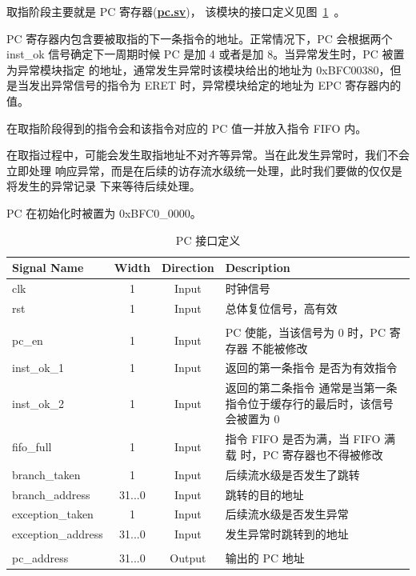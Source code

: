 \documentclass[blue,normal,cn,hide]{elegantbook}
\begin{document}
取指阶段主要就是 PC 寄存器(\href{https://github.com/name1e5s/Sirius/blob/master/pc.sv}{\textbf{pc.sv}})，
该模块的接口定义见图~\ref{tab:PCInterface}~。

PC 寄存器内包含要被取指的下一条指令的地址。正常情况下，PC 会根据两个 inst\_ok
信号确定下一周期时候 PC 是加 4 或者是加 8。当异常发生时，PC 被置为异常模块指定
的地址，通常发生异常时该模块给出的地址为 0xBFC00380，但是当发出异常信号的指令为
ERET 时，异常模块给定的地址为 EPC 寄存器内的值。

在取指阶段得到的指令会和该指令对应的 PC 值一并放入指令 FIFO 内。

在取指过程中，可能会发生取指地址不对齐等异常。当在此发生异常时，我们不会立即处理
响应异常，而是在后续的访存流水级统一处理，此时我们要做的仅仅是将发生的异常记录
下来等待后续处理。

PC 在初始化时被置为 0xBFC0\_0000。

\begin{table}
    \renewcommand\arraystretch{1.25}
    \centering
    \begin{tabular}{lccm{}}
        \toprule 
        \rowcolor{black!20} \textbf{Signal Name} & \textbf{Width} & \textbf{Direction} & \textbf{Description} \\
        \midrule
        clk & 1 & Input & 时钟信号 \\
        rst & 1 & Input & 总体复位信号，高有效 \\
        \\
        pc\_en & 1 & Input & PC 使能，当该信号为 0 时，PC 寄存器
        不能被修改 \\
        inst\_ok\_1 & 1 & Input & 返回的第一条指令
        是否为有效指令 \\
        inst\_ok\_2 & 1 & Input & 返回的第二条指令
        通常是当第一条指令位于缓存行的最后时，该信号会被置为 0 \\
        fifo\_full & 1 & Input & 指令 FIFO 是否为满，当 FIFO 满载
        时，PC 寄存器也不得被修改 \\
        branch\_taken & 1 & Input & 后续流水级是否发生了跳转 \\
        branch\_address & 31...0 & Input & 跳转的目的地址 \\ 
        exception\_taken & 1 & Input & 后续流水级是否发生异常 \\
        exception\_address & 31...0 & Input & 发生异常时跳转到的地址 \\
        \\
        pc\_address & 31...0 & Output & 输出的 PC 地址 \\
        \bottomrule
    \end{tabular}
    \caption{PC 接口定义}
    \label{tab:PCInterface}
\end{table}
\end{document}
